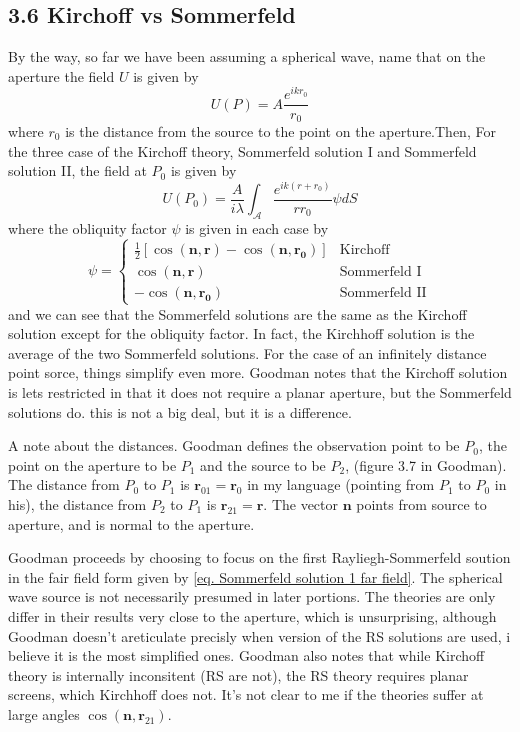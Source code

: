\documentclass[../../main.tex]{subfiles}
\begin{document}
\subsection{3.6 Kirchoff vs Sommerfeld}
By the way, so far we have been assuming a spherical wave, name that on the aperture the field $U$ is given by
\begin{equation}\label{eq. spherical wave}
    U(P)=A\frac{e^{ikr_0}}{r_0}
\end{equation}
where $r_0$ is the distance from the source to the point on the aperture.Then, For the three case of the Kirchoff theory, Sommerfeld solution I and Sommerfeld solution II, the field at $P_0$ is given by
\begin{equation}
    U(P_0)=\frac{A}{i\lambda}\int_{\mathcal{A}}\frac{e^{ik(r+r_0)}}{rr_0}\psi dS
\end{equation}
where the obliquity factor $\psi$ is given in each case by
\begin{equation}\label{eq. obliquity factor}
    \psi=
    \begin{cases}
        \tfrac12 [\cos(\mathbf{n},\mathbf{r})-\cos(\mathbf{n},\mathbf{r_0})] & \text{Kirchoff}\\
    \cos(\mathbf{n},\mathbf{r}) & \text{Sommerfeld I}\\
    -\cos(\mathbf{n},\mathbf{r_0}) & \text{Sommerfeld II}
    \end{cases}
\end{equation}
and we can see that the Sommerfeld solutions are the same as the Kirchoff solution except for the obliquity factor. In fact, the Kirchhoff solution is the average of the two Sommerfeld solutions. For the case of an infinitely distance point sorce, things simplify even more. Goodman notes that the Kirchoff solution is lets restricted in that it does not require a planar aperture, but the Sommerfeld solutions do. this is not a big deal, but it is a difference.

A note about the distances. Goodman defines the observation point to be $P_0$, the point on the aperture to be $P_1$ and the source to be $P_2$, (figure 3.7 in Goodman). The distance from $P_0$ to $P_1$ is $\mathbf{r}_{01}=\mathbf{r}_0$ in my language (pointing from $P_1$ to $P_0$ in his), the distance from $P_2$ to $P_1$ is $\mathbf{r}_{21}=\mathbf{r}$. The vector $\mathbf{n}$ points from source to aperture, and is normal to the aperture.

Goodman proceeds by choosing to focus on the first Rayliegh-Sommerfeld soution in the fair field form given by \cref{eq. Sommerfeld solution 1 far field}. The spherical wave source is not necessarily presumed in later portions. The theories are only differ in their results very close to the aperture, which is unsurprising, although Goodman doesn't areticulate precisly when version of the RS solutions are used, i believe it is the most simplified ones. Goodman also notes that while Kirchoff theory is internally inconsitent (RS are not), the RS theory requires planar screens, which Kirchhoff does not. It's not clear to me if the theories suffer at large angles $\cos{(\mathbf{n},\mathbf{r}_{21})}$. 
\end{document}
